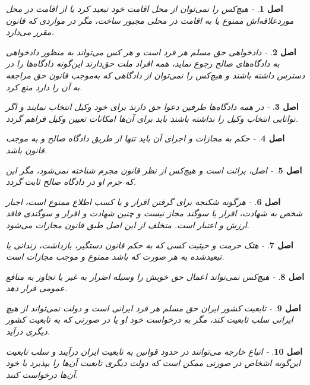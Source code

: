 \documentclass[12pt]{article}
\newtheorem{asl}{اصل}
\begin{document}
\begin{asl}- 
هیچ‌کس را نمی‌توان از محل اقامت خود تبعید کرد یا از اقامت در محل موردعلاقه‌اش ممنوع یا به اقامت در محلی مجبور ساخت‌، مگر در مواردی که قانون مقرر می‌دارد.
\end{asl}

\begin{asl}- 
دادخواهی حق مسلم هر فرد است و هر کس می‌تواند به منظور دادخواهی به دادگاه‌های صالح رجوع نماید، همه افراد ملت حق‌دارند این‌گونه دادگاه‌ها را در دسترس داشته باشند و هیچ‌کس را نمی‌توان از دادگاهی که به‌موجب قانون حق مراجعه به آن را دارد منع کرد.
\end{asl}

\begin{asl}- 
در همه دادگاه‌ها طرفین دعوا حق دارند برای خود وکیل انتخاب نمایند و اگر توانایی انتخاب وکیل را نداشته باشند باید برای آن‌ها امکانات تعیین وکیل فراهم گردد.
\end{asl}

\begin{asl}- 
حکم به مجازات و اجرای آن باید تنها از طریق دادگاه صالح و به موجب قانون باشد.
\end{asl}

\begin{asl}- 
اصل‌، برائت است و هیچ‌کس از نظر قانون مجرم شناخته نمی‌شود، مگر این که جرم او در دادگاه صالح ثابت گردد.
\end{asl}

\begin{asl}- 
هرگونه شکنجه برای گرفتن اقرار و یا کسب اطلاع ممنوع است‌، اجبار شخص به شهادت‌، اقرار یا سوگند مجاز نیست و چنین شهادت و اقرار و سوگندی فاقد ارزش و اعتبار است‌.
متخلف از این اصل طبق قانون مجازات می‌شود.
\end{asl}

\begin{asl}- 
هتک حرمت و حیثیت کسی که به حکم قانون دستگیر، بازداشت‌، زندانی یا تبعیدشده به هر صورت که باشد ممنوع و موجب مجازات است.
\end{asl}

\begin{asl}- 
هیچ‌کس نمی‌تواند اعمال حق خویش را وسیله اضرار به غیر یا تجاوز به منافع عمومی قرار دهد.
\end{asl}

\begin{asl}- 
تابعیت کشور ایران حق مسلم هر فرد ایرانی است و دولت نمی‌تواند از هیچ ایرانی سلب تابعیت کند، مگر به درخواست خود او یا در صورتی که به تابعیت کشور دیگری درآید.
\end{asl}

\begin{asl}- 
اتباع خارجه می‌توانند در حدود قوانین به تابعیت ایران درآیند و سلب تابعیت این‌گونه اشخاص در صورتی ممکن است که دولت دیگری تابعیت آن‌ها را بپذیرد یا خود آن‌ها درخواست کنند.
\end{asl}
\end{document}
